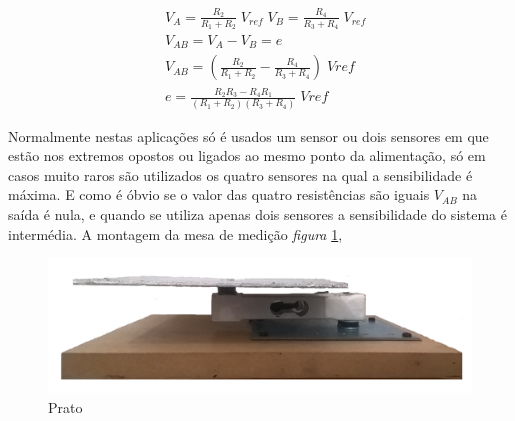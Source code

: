 \begin{minipage}[!b]{.6\linewidth}
	\begin{align}
		\label{eq:wheatstone}
		&V_A =  \frac{R_2}{R_1 + R_2} \; V_{ref} \; V_B=\frac{R_4}{R_3 + R_4} \; V_{ref} \\
		&V_{AB} =  V_A - V_B = e \\
		&V_{AB}= \left(\frac{R_2}{R_1 + R_2} - \frac{R_4}{R_3 + R_4}\right) \; Vref \\
		&e = \frac{R_2 R_3 - R_4 R_1}{(R_1 + R_2)(R_3 + R_4)} \; Vref
	\end{align}
\end{minipage}
Normalmente nestas aplicações só é usados um sensor ou dois sensores em que estão nos extremos opostos  ou ligados ao mesmo ponto da alimentação, só em casos muito raros são utilizados os quatro sensores na qual a sensibilidade é máxima. E como é óbvio se o valor das quatro resistências são iguais $V_{AB}$ na saída é nula, e quando se utiliza apenas dois sensores a sensibilidade do sistema é intermédia.
\newpage
A montagem da mesa de medição \textit{figura} \ref{Prato},
\begin{minipage}[!b]{\linewidth}
\begin{figure}[H]
	\centering
	\includegraphics[scale=0.16]{./image/PESTA/material/Prato.jpg}
	\caption{Prato}
	\label{Prato}
\end{figure}
\end{minipage}
\newpage

